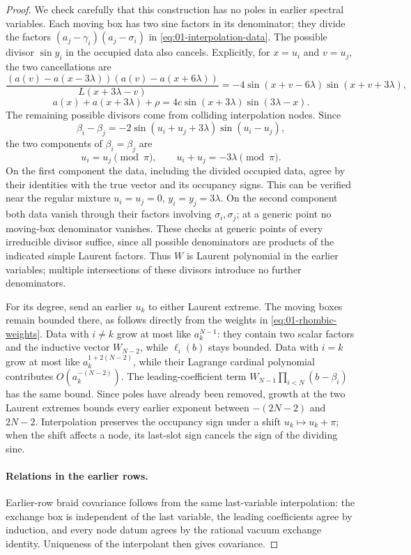\begin{proof}
We check carefully that this construction has no poles in earlier
spectral variables. Each moving box has two sine factors in its
denominator; they divide the factors
$(a_j-\gamma_i)(a_j-\sigma_i)$ in
\eqref{eq:01-interpolation-data}. The possible divisor $\sin y_i$
in the occupied data also cancels. Explicitly, for $x=u_i$ and
$v=u_j$, the two cancellations are
\[
 \frac{(a(v)-a(x-3\lambda))(a(v)-a(x+6\lambda))}{L(x+3\lambda-v)}
 =-4\sin(x+v-6\lambda)\sin(x+v+3\lambda),
\]
\[
 a(x)+a(x+3\lambda)+\rho
 =4c\sin(x+3\lambda)\sin(3\lambda-x).
\]
The remaining possible divisors come from colliding interpolation
nodes. Since
\[
 \beta_i-\beta_j
 =-2\sin(u_i+u_j+3\lambda)\sin(u_i-u_j),
\]
the two components of $\beta_i=\beta_j$ are
\[
 u_i=u_j\pmod\pi,
 \qquad u_i+u_j=-3\lambda\pmod\pi.
\]
On the first component the data, including the divided occupied data,
agree by their identities with the true vector and its occupancy
signs. This can be verified near the regular mixture
$u_i=u_j=0$, $y_i=y_j=3\lambda$. On the second component both data
vanish through their factors involving $\sigma_i,\sigma_j$; at a
generic point no moving-box denominator vanishes. These checks at
generic points of every irreducible divisor suffice, since all
possible denominators are products of the indicated simple Laurent
factors. Thus $W$ is Laurent polynomial in the earlier variables;
multiple intersections of these divisors introduce no further denominators.

For its degree, send an earlier $u_k$ to either Laurent extreme.
The moving boxes remain bounded there, as follows directly from
the weights in \eqref{eq:01-rhombic-weights}.
Data with $i\ne k$ grow at most like $a_k^{N-1}$: they contain two
scalar factors and the inductive vector $W_{N-2}$, while
$\ell_i(b)$ stays bounded. Data with $i=k$
grow at most like $a_k^{1+2(N-2)}$, while their Lagrange cardinal
polynomial contributes $O(a_k^{-(N-2)})$. The leading-coefficient
term $W_{N-1}\prod_{i<N}(b-\beta_i)$ has the same bound. Since poles
have already been removed, growth at the two Laurent extremes bounds
every earlier exponent between $-(2N-2)$ and $2N-2$. Interpolation preserves
the occupancy sign under a shift $u_k\mapsto u_k+\pi$; when the
shift affects a node, its last-slot sign cancels the sign of the
dividing sine.

\paragraph{Relations in the earlier rows.}
Earlier-row braid covariance follows from the same last-variable
interpolation: the exchange box is independent of the last variable,
the leading coefficients agree by induction, and every node datum agrees
by the rational vacuum exchange identity. Uniqueness of the interpolant
then gives covariance.


\end{proof}
